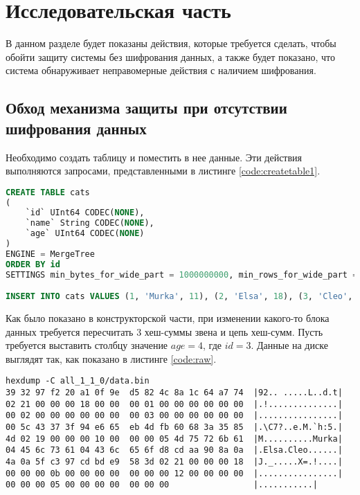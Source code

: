 \section{Исследовательская часть}

В данном разделе будет показаны действия, которые требуется сделать, чтобы обойти защиту системы без шифрования данных, а также будет показано, что система обнаруживает неправомерные действия с наличием шифрования.

\subsection{Обход механизма защиты при отсутствии шифрования данных}

Необходимо создать таблицу и поместить в нее данные. Эти действия выполняются запросами, представленными в листинге \ref{code:createtable1}.

\begin{lstlisting}[language=sql, label=code:createtable1, caption={Создание таблицы с компактным хранением.}]
CREATE TABLE cats
(
    `id` UInt64 CODEC(NONE),
    `name` String CODEC(NONE),
    `age` UInt64 CODEC(NONE)
)
ENGINE = MergeTree
ORDER BY id
SETTINGS min_bytes_for_wide_part = 1000000000, min_rows_for_wide_part = 1000000000, use_parts_chainer = 1

INSERT INTO cats VALUES (1, 'Murka', 11), (2, 'Elsa', 18), (3, 'Cleo', 5)
\end{lstlisting}

Как было показано в конструкторской части, при изменении какого-то блока данных требуется пересчитать 3 хеш-суммы звена и цепь хеш-сумм. Пусть требуется выставить столбцу значение $age = 4$, где $id = 3$. Данные на диске выглядят так, как показано в листинге \ref{code:raw}.

\pagebreak

\begin{lstlisting}[label=code:raw, caption={Данные записанного звена в сыром виде.}]
hexdump -C all_1_1_0/data.bin
39 32 97 f2 20 a1 0f 9e  d5 82 4c 8a 1c 64 a7 74  |92.. .....L..d.t|
02 21 00 00 00 18 00 00  00 01 00 00 00 00 00 00  |.!..............|
00 02 00 00 00 00 00 00  00 03 00 00 00 00 00 00  |................|
00 5c 43 37 3f 94 e6 65  eb 4d fb 60 68 3a 35 85  |.\C7?..e.M.`h:5.|
4d 02 19 00 00 00 10 00  00 00 05 4d 75 72 6b 61  |M..........Murka|
04 45 6c 73 61 04 43 6c  65 6f d8 cd aa 90 8a 0a  |.Elsa.Cleo......|
4a 0a 5f c3 97 cd bd e9  58 3d 02 21 00 00 00 18  |J._.....X=.!....|
00 00 00 0b 00 00 00 00  00 00 00 12 00 00 00 00  |................|
00 00 00 05 00 00 00 00  00 00 00                 |...........|
\end{lstlisting}

